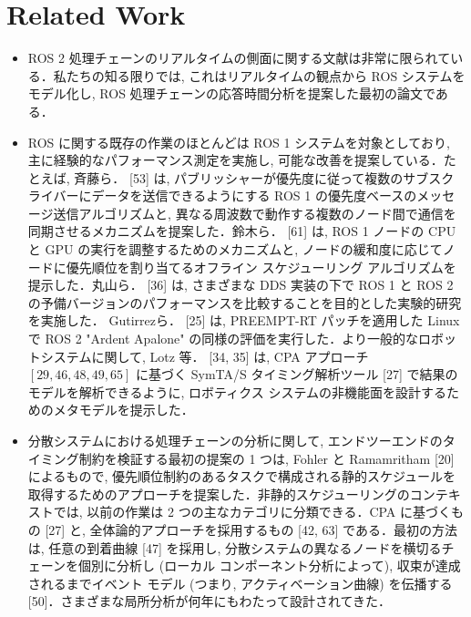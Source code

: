 
\section{Related Work}
\label{sec: related work}

\begin{frame}{}
    \begin{itemize}
        \item ROS 2 処理チェーンのリアルタイムの側面に関する文献は非常に限られている．私たちの知る限りでは, これはリアルタイムの観点から ROS システムをモデル化し, ROS 処理チェーンの応答時間分析を提案した最初の論文である．
    \end{itemize}
\end{frame}

\begin{frame}{}
    \begin{itemize}
        \item ROS に関する既存の作業のほとんどは ROS 1 システムを対象としており, 主に経験的なパフォーマンス測定を実施し, 可能な改善を提案している．たとえば, 斉藤ら． [53] は, パブリッシャーが優先度に従って複数のサブスクライバーにデータを送信できるようにする ROS 1 の優先度ベースのメッセージ送信アルゴリズムと, 異なる周波数で動作する複数のノード間で通信を同期させるメカニズムを提案した．鈴木ら． [61] は, ROS 1 ノードの CPU と GPU の実行を調整するためのメカニズムと, ノードの緩和度に応じてノードに優先順位を割り当てるオフライン スケジューリング アルゴリズムを提示した．丸山ら． [36] は, さまざまな DDS 実装の下で ROS 1 と ROS 2 の予備バージョンのパフォーマンスを比較することを目的とした実験的研究を実施した． Gutirrezら． [25] は, PREEMPT-RT パッチを適用した Linux で ROS 2 "Ardent Apalone" の同様の評価を実行した．より一般的なロボットシステムに関して, Lotz 等． [34, 35] は, CPA アプローチ $[29,46,48,49,65]$ に基づく SymTA/S タイミング解析ツール [27] で結果のモデルを解析できるように, ロボティクス システムの非機能面を設計するためのメタモデルを提示した．
    \end{itemize}
\end{frame}

\begin{frame}{}
    \begin{itemize}
        \item 分散システムにおける処理チェーンの分析に関して, エンドツーエンドのタイミング制約を検証する最初の提案の 1 つは, Fohler と Ramamritham [20] によるもので, 優先順位制約のあるタスクで構成される静的スケジュールを取得するためのアプローチを提案した．非静的スケジューリングのコンテキストでは, 以前の作業は 2 つの主なカテゴリに分類できる．CPA に基づくもの [27] と, 全体論的アプローチを採用するもの [42, 63] である．最初の方法は, 任意の到着曲線 [47] を採用し, 分散システムの異なるノードを横切るチェーンを個別に分析し (ローカル コンポーネント分析によって), 収束が達成されるまでイベント モデル (つまり, アクティベーション曲線) を伝播する [50]．さまざまな局所分析が何年にもわたって設計されてきた．
    \end{itemize}
\end{frame}

